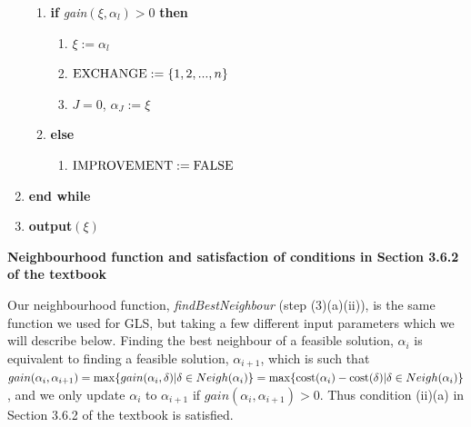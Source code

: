 \documentclass[12pt,a4paper,reqno]{article}
\begin{document}
\begin{enumerate}
\begin{enumerate}
\item \textbf{if} \textit{gain}$(\xi,\alpha_l) > 0$ \textbf{then}
\begin{enumerate}
\item[] $\xi:=\alpha_l$
\item[] $\textnormal{EXCHANGE} := \{1,2,...,n\}$
\item[] \color{red} $J=0$, $\alpha_J := \xi$ \color{black}
\end{enumerate}
\item[] \textbf{else}
\begin{enumerate}
\item[] $\textnormal{IMPROVEMENT} := \textnormal{FALSE}$
\end{enumerate}
\end{enumerate}
\item[] \textbf{end while}
\item \textbf{output}$(\xi)$
\end{enumerate}

\textbf{Neighbourhood function and satisfaction of conditions in Section 3.6.2 of the textbook}

Our neighbourhood function, \textit{findBestNeighbour} (step (3)(a)(ii)), is the same function we used for GLS, but taking a few different input parameters which we will describe below. Finding the best neighbour of a feasible solution, $\alpha_i$ is equivalent to finding a feasible solution, $\alpha_{i+1}$, which is such that $gain(\alpha_i,\alpha_{i+1})=\max\{gain(\alpha_i,\delta) | \delta\in Neigh(\alpha_i)\} = \max\{\textnormal{cost}(\alpha_i) - \textnormal{cost}(\delta) | \delta\in Neigh(\alpha_i)\}$, and we only update $\alpha_i$ to $\alpha_{i+1}$ if $gain(\alpha_i,\alpha_{i+1}) > 0$. Thus condition (ii)(a) in Section 3.6.2 of the textbook is satisfied.\\
\end{document}
